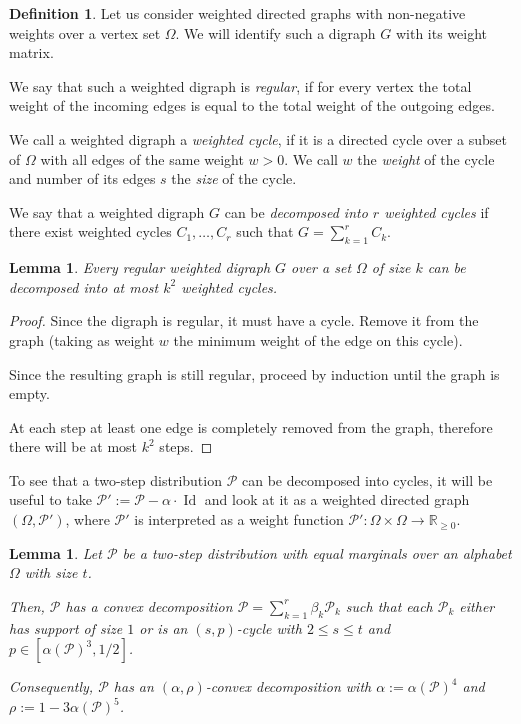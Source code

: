 \documentclass{daj}
\newcommand{\1}{\mathbbm{1}}
\theoremstyle{plain}
\newtheorem{lemma}[theorem]{Lemma}
\theoremstyle{definition}
\newtheorem{definition}[theorem]{Definition}
\DeclareMathOperator{\Id}{Id}
\newcommand{\cP}{\mathcal{P}}
\begin{document}
\begin{definition}
Let us consider weighted directed graphs with non-negative weights 
over a vertex set $\Omega$. We will identify such a digraph $G$
with its weight matrix.

We say that such a weighted digraph is \emph{regular}, if for every vertex
the total weight of the incoming edges is equal to the total weight of
the outgoing edges.

We call a weighted digraph a \emph{weighted cycle}, if it is a directed cycle 
over a subset of $\Omega$ with all edges of the same weight $w > 0$.
We call $w$ the \emph{weight} of the cycle and number of its edges $s$
the \emph{size} of the cycle.

We say that a weighted digraph $G$ can be 
\emph{decomposed into $r$ weighted cycles}
if there exist weighted cycles $C_1, \ldots, C_r$  such that 
$G = \sum_{k=1}^r C_k$.
\end{definition}

\begin{lemma}
\label{lem:digraph-decomposition}
Every regular weighted digraph $G$ over a set $\Omega$ of size $k$ 
can be decomposed into at most $k^2$ weighted cycles.
\end{lemma}
\begin{proof}
Since the digraph is regular, it must have a cycle. Remove it from the graph
(taking as weight $w$ the minimum weight of the edge on this cycle).

Since the resulting graph is still regular, 
proceed by induction until the graph is empty.

At each step at least one edge is completely removed from the graph,
therefore there will be at most $k^2$ steps.
\end{proof}

To see that a two-step distribution $\cP$ can be decomposed into cycles, 
it will be useful to take $\cP' := \cP - \alpha \cdot \Id$ and
look at it as a weighted directed graph $(\Omega, \cP')$,
where $\cP'$ is interpreted as a weight function 
$\cP': \Omega \times \Omega \to \mathbb{R}_{\ge 0}$.

\begin{lemma}
\label{lem:cycle-decomposition}
Let $\cP$ be a two-step distribution 
with equal marginals 
over an alphabet $\Omega$ with size $t$.

Then, $\cP$ has a convex decomposition 
$\cP = \sum_{k=1}^r \beta_k \cP_k$ such that each $\cP_k$ either
has support of size $1$ or is
an $(s, p)$-cycle with $2 \le s \le t$ and $p \in [\alpha(\cP)^3, 1/2]$. 

Consequently, $\cP$ has an $(\alpha, \rho)$-convex decomposition with
$\alpha := \alpha(\cP)^4$ and $\rho := 1-3\alpha(\cP)^5$.
\end{lemma}
\end{document}
